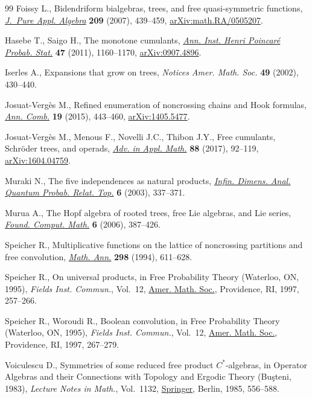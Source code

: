 \documentclass[pdftex]{sigma}%
\numberwithin{equation}{section}
\begin{document}
\begin{thebibliography}{99}
Foissy L., Bidendriform bialgebras, trees, and free quasi-symmetric functions,
 \href{https://doi.org/10.1016/j.jpaa.2006.06.005}{\textit{J.~Pure Appl. Algebra}} \textbf{209} (2007), 439--459,
 \href{https://arxiv.org/abs/math.RA/0505207}{arXiv:math.RA/0505207}.

Hasebe T., Saigo H., The monotone cumulants, \href{https://doi.org/10.1214/10-AIHP379}{\textit{Ann. Inst. Henri
 Poincar\'e Probab. Stat.}} \textbf{47} (2011), 1160--1170, \href{https://arxiv.org/abs/0907.4896}{arXiv:0907.4896}.

Iserles A., Expansions that grow on trees, \textit{Notices Amer. Math. Soc.}
 \textbf{49} (2002), 430--440.

Josuat-Verg\`es M., Refined enumeration of noncrossing chains and {H}ook
 formulas, \href{https://doi.org/10.1007/s00026-015-0278-5}{\textit{Ann. Comb.}} \textbf{19} (2015), 443--460,
 \href{https://arxiv.org/abs/1405.5477}{arXiv:1405.5477}.

Josuat-Verg\`es M., Menous F., Novelli J.C., Thibon J.Y., Free cumulants,
 {S}chr\"oder trees, and operads, \href{https://doi.org/10.1016/j.aam.2017.02.002}{\textit{Adv. in Appl. Math.}} \textbf{88}
 (2017), 92--119, \href{https://arxiv.org/abs/1604.04759}{arXiv:1604.04759}.

Muraki N., The five independences as natural products, \href{https://doi.org/10.1142/S0219025703001365}{\textit{Infin. Dimens.
 Anal. Quantum Probab. Relat. Top.}} \textbf{6} (2003), 337--371.

Murua A., The {H}opf algebra of rooted trees, free {L}ie algebras, and {L}ie
 series, \href{https://doi.org/10.1007/s10208-003-0111-0}{\textit{Found. Comput. Math.}} \textbf{6} (2006), 387--426.

Speicher R., Multiplicative functions on the lattice of noncrossing partitions
 and free convolution, \href{https://doi.org/10.1007/BF01459754}{\textit{Math. Ann.}} \textbf{298} (1994), 611--628.

Speicher R., On universal products, in Free Probability Theory ({W}aterloo,
 {ON}, 1995), \textit{Fields Inst. Commun.}, Vol.~12, \href{https://doi.org/10.1090/fic/012/12}{Amer. Math. Soc.},
 Providence, RI, 1997, 257--266.

Speicher R., Woroudi R., Boolean convolution, in Free Probability Theory
 ({W}aterloo, {ON}, 1995), \textit{Fields Inst. Commun.}, Vol.~12, \href{https://doi.org/10.1090/fic/012/13}{Amer. Math.
 Soc.}, Providence, RI, 1997, 267--279.

Voiculescu D., Symmetries of some reduced free product {$C^\ast$}-algebras, in
 Operator Algebras and their Connections with Topology and Ergodic Theory
 ({B}u\c{s}teni, 1983), \textit{Lecture Notes in Math.}, Vol.~1132, \href{https://doi.org/10.1007/BFb0074909}{Springer},
 Berlin, 1985, 556--588.

\end{thebibliography}\LastPageEnding
\end{document}
